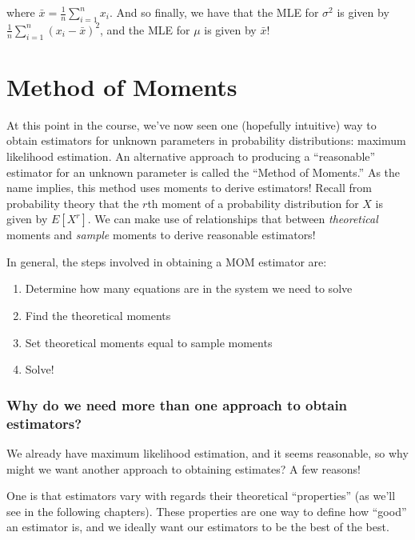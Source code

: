 \documentclass[
  letterpaper,
  DIV=11,
  numbers=noendperiod]{scrreprt}
\begin{document}
where \(\bar{x} = \frac{1}{n} \sum_{i = 1}^n x_i\). And so finally, we
have that the MLE for \(\sigma^2\) is given by
\(\frac{1}{n} \sum_{i = 1}^n (x_i - \bar{x} )^2\), and the MLE for
\(\mu\) is given by \(\bar{x}\)!


\chapter{Method of Moments}\label{method-of-moments}

At this point in the course, we've now seen one (hopefully intuitive)
way to obtain estimators for unknown parameters in probability
distributions: maximum likelihood estimation. An alternative approach to
producing a ``reasonable'' estimator for an unknown parameter is called
the ``Method of Moments.'' As the name implies, this method uses moments
to derive estimators! Recall from probability theory that the \(r\)th
moment of a probability distribution for \(X\) is given by \(E[X^r]\).
We can make use of relationships that between \emph{theoretical} moments
and \emph{sample} moments to derive reasonable estimators!

In general, the steps involved in obtaining a MOM estimator are:

\begin{enumerate}
\def\labelenumi{\arabic{enumi}.}
\item
  Determine how many equations are in the system we need to solve
\item
  Find the theoretical moments
\item
  Set theoretical moments equal to sample moments
\item
  Solve!
\end{enumerate}

\subsection*{Why do we need more than one approach to obtain
estimators?}\label{why-do-we-need-more-than-one-approach-to-obtain-estimators}

We already have maximum likelihood estimation, and it seems reasonable,
so why might we want another approach to obtaining estimates? A few
reasons!

One is that estimators vary with regards their theoretical
``properties'' (as we'll see in the following chapters). These
properties are one way to define how ``good'' an estimator is, and we
ideally want our estimators to be the best of the best.
\end{document}
